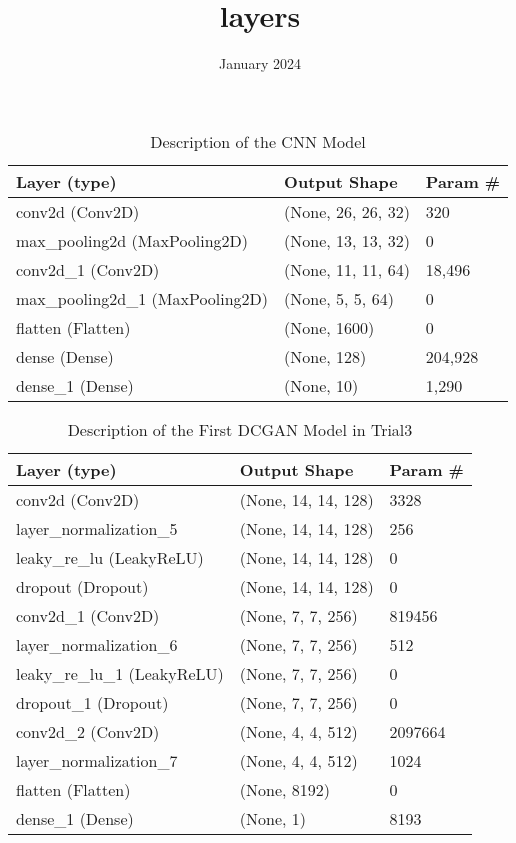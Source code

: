 \documentclass{article}
\title{layers}
\date{January 2024}
\begin{document}
\begin{table}[h]
\centering
\begin{tabular}{|l|l|l|}
\hline
\textbf{Layer (type)}          & \textbf{Output Shape}    & \textbf{Param \#} \\
\hline
conv2d (Conv2D)                & (None, 26, 26, 32)       & 320 \\
max\_pooling2d (MaxPooling2D)  & (None, 13, 13, 32)       & 0 \\
conv2d\_1 (Conv2D)             & (None, 11, 11, 64)       & 18,496 \\
max\_pooling2d\_1 (MaxPooling2D)& (None, 5, 5, 64)         & 0 \\
flatten (Flatten)              & (None, 1600)             & 0 \\
dense (Dense)                  & (None, 128)              & 204,928 \\
dense\_1 (Dense)               & (None, 10)               & 1,290 \\
\hline
\end{tabular}
\caption{Description of the CNN Model}
\label{table:model2}
\end{table}



\begin{table}[h]
\centering
\begin{tabular}{|l|l|l|}
\hline
\textbf{Layer (type)}           & \textbf{Output Shape} & \textbf{Param \#} \\
\hline
conv2d (Conv2D)                 & (None, 14, 14, 128)   & 3328 \\
layer\_normalization\_5         & (None, 14, 14, 128)   & 256 \\
leaky\_re\_lu (LeakyReLU)       & (None, 14, 14, 128)   & 0 \\
dropout (Dropout)               & (None, 14, 14, 128)   & 0 \\
conv2d\_1 (Conv2D)               & (None, 7, 7, 256)     & 819456 \\
layer\_normalization\_6         & (None, 7, 7, 256)     & 512 \\
leaky\_re\_lu\_1 (LeakyReLU)     & (None, 7, 7, 256)     & 0 \\
dropout\_1 (Dropout)             & (None, 7, 7, 256)     & 0 \\
conv2d\_2 (Conv2D)               & (None, 4, 4, 512)     & 2097664 \\
layer\_normalization\_7         & (None, 4, 4, 512)     & 1024 \\
flatten (Flatten)               & (None, 8192)          & 0 \\
dense\_1 (Dense)                 & (None, 1)             & 8193 \\
\hline
\end{tabular}
\caption{Description of the First DCGAN Model in Trial3}
\label{table:model1}
\end{table}
\end{document}
